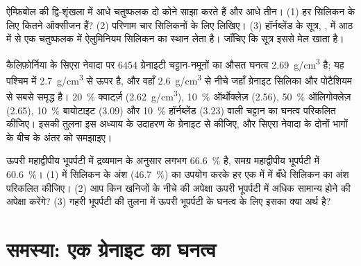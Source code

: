 \begin{exercise}[$\star\star\star$]\label{exo:g11:minerals:13}
ऐम्फ़िबोल की द्वि-शृंखला में आधे चतुष्फलक दो कोने साझा करते हैं और
आधे तीन। (1) हर सिलिकन के लिए कितने ऑक्सीजन हैं? (2) परिणाम
चार सिलिकनों के लिए लिखिए। (3) हॉर्नब्लेंड के सूत्र,
, में आठ में से एक चतुष्फलक में ऐलुमिनियम
सिलिकन का स्थान लेता है। जाँचिए कि सूत्र इससे मेल खाता है।
\end{exercise}

\begin{exercise}[$\star\star\star$]\label{exo:g11:minerals:14}
कैलिफ़ोर्निया के सिएरा नेवादा पर \num{6454} ग्रेनाइटी चट्टान-नमूनों का
औसत घनत्व \qty{2.69}{g/cm^3} है; यह पश्चिम में \qty{2.7}{g/cm^3} से ऊपर है,
और वहाँ \qty{2.6}{g/cm^3} से नीचे जहाँ ग्रेनाइट सिलिका
और पोटैशियम से सबसे समृद्ध है। \qty{20}{\percent} क्वार्ट्ज़
(\qty{2.62}{g/cm^3}), \qty{10}{\percent} ऑर्थोक्लेज़ (\qty{2.56}{}),
\qty{50}{\percent} ऑलिगोक्लेज़ (\qty{2.65}{}), \qty{10}{\percent} बायोटाइट
(\qty{3.09}{}) और \qty{10}{\percent} हॉर्नब्लेंड (\qty{3.23}{}) वाली चट्टान का घनत्व परिकलित कीजिए। इसकी तुलना
इस अध्याय के उदाहरण के ग्रेनाइट से कीजिए, और सिएरा नेवादा के दोनों भागों के
बीच के अंतर को समझाइए।
\end{exercise}

\begin{exercise}[$\star\star\star$]\label{exo:g11:minerals:15}
ऊपरी महाद्वीपीय भूपर्पटी में द्रव्यमान के अनुसार लगभग \qty{66.6}{\percent} 
है, समग्र महाद्वीपीय भूपर्पटी में \qty{60.6}{\percent}। (1)
 में सिलिकन के अंश (\qty{46.7}{\percent}) का उपयोग करके हर एक में
 में बँधे सिलिकन का अंश परिकलित कीजिए। (2) आप किन खनिजों के
नीचे की अपेक्षा ऊपरी भूपर्पटी में अधिक सामान्य होने की अपेक्षा करेंगे? (3) गहरी भूपर्पटी की तुलना में
ऊपरी भूपर्पटी के घनत्व के लिए इसका क्या अर्थ है?
\end{exercise}

\section{समस्या: एक ग्रेनाइट का घनत्व}

